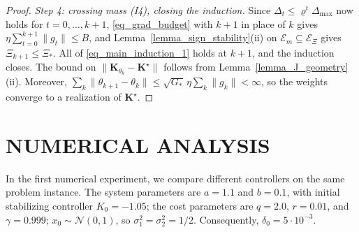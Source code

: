 \documentclass[letterpaper, 10 pt, conference]{ieeeconf}
\newcommand{\bK}{\mathbf{K}}
\newcommand{\cE}{\mathcal{E}}
\newcommand{\cN}{\mathcal{N}}
\newcommand{\Lemm}{Lemma}
\begin{document}
\begin{proof}
    \emph{Step 4: crossing mass \textup{(I4)}, closing the induction.} Since $\Delta_{t} \le \varrho^{t}\Delta_{\max}$ now holds for $t=0,\dots,k+1$, \eqref{eq_grad_budget} with $k+1$ in place of $k$ gives $\eta\sum_{t=0}^{k+1}\|g_{t}\| \le B$, and \Lemm~\ref{lemma_sign_stability}(ii) on $\cE_m\subseteq\cE_{\Xi}$ gives $\Xi_{k+1} \le \Xi_{\ast}$. All of \eqref{eq_main_induction_1} holds at $k+1$, and the induction closes. The bound on $\|\bK_{\theta_{k}} - \bK^{\star}\|$ follows from \Lemm~\ref{lemma_J_geometry}(ii). Moreover,
$\sum_k\|\theta_{k+1}-\theta_k\|\le\sqrt{G_\ast}\,\eta\sum_k\|g_k\|<\infty$,
so the weights converge to a realization of $\bK^\star$.
\end{proof}

\section{NUMERICAL ANALYSIS}
\label{section_simulations}
In the first numerical experiment, we compare different controllers on the same problem instance. The system parameters are $a = 1.1$ and $ b = 0.1$, with initial stabilizing controller $K_{0} = -1.05$; the cost parameters are $q=2.0$, $r=0.01$, and $\gamma=0.999$; $x_0\sim \cN(0,1)$, so $\sigma_{1}^{2} = \sigma_{2}^{2} = 1/2$. Consequently, $\delta_{0} = 5\cdot 10^{-3}$.
\end{document}
